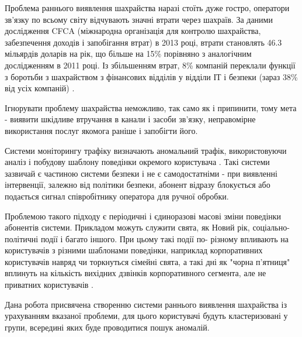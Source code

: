 \newpage
{}
	
	Проблема раннього виявлення шахрайства наразі стоїть дуже гостро, оператори зв'язку по всьому світу відчувають значні втрати через шахраїв. За даними дослідження CFCA (міжнародна організація для контролю шахрайства, забезпечення доходів і запобігання втрат) в 2013 році, втрати становлять 46.3 мільярдів доларів на рік, що більше на 15\% порівняно з аналогічним дослідженням в 2011 році. Із збільшенням втрат, 8\% компаній переклали функції з боротьби з шахрайством з фінансових відділів у відділи ІТ і безпеки (зараз 38\% від усіх компаній) \cite{cfca2013survey}.

	Ігнорувати проблему шахрайства неможливо, так само як і припинити, тому мета - виявити шкідливе втручання в канали і засоби зв'язку, неправомірне використання послуг якомога раніше і запобігти його.

	Системи моніторингу трафіку визначають аномальний трафік, використовуючи аналіз і побудову шаблону поведінки окремого користувача \cite{telenik2009detection} \cite{rosastelecommunications}. Такі системи зазвичай є частиною системи безпеки і не є самодостатніми - при виявленні інтервенції, залежно від політики безпеки, абонент відразу блокується або подається сигнал співробітнику оператора для ручної обробки.

	Проблемою такого підходу є періодичні і єдиноразові масові зміни поведінки абонентів системи. Прикладом можуть служити свята, як Новий рік, соціально-політичні події і багато іншого. При цьому такі події по- різному впливають на користувачів з різними шаблонами поведінки, наприклад корпоративних користувачів навряд чи торкнуться сімейні свята, а такі дні як "чорна п'ятниця" вплинуть на кількість вихідних дзвінків корпоративного сегмента, але не приватних користувачів \cite{rader2014cdr}.

	Дана робота присвячена створенню системи раннього виявлення шахрайства із урахуванням вказаної проблеми, для цього користувачі будуть кластеризовані у групи, всередині яких буде проводитися пошук аномалій.
